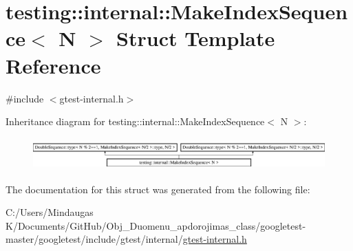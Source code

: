 \hypertarget{structtesting_1_1internal_1_1_make_index_sequence}{}\section{testing\+::internal\+::Make\+Index\+Sequence$<$ N $>$ Struct Template Reference}
\label{structtesting_1_1internal_1_1_make_index_sequence}


{\ttfamily \#include $<$gtest-\/internal.\+h$>$}

Inheritance diagram for testing\+::internal\+::Make\+Index\+Sequence$<$ N $>$\+:\begin{figure}[H]
\begin{center}
\leavevmode
\includegraphics[height=1.225383cm]{db/d4a/structtesting_1_1internal_1_1_make_index_sequence}
\end{center}
\end{figure}


The documentation for this struct was generated from the following file\+:\begin{DoxyCompactItemize}
\item 
C\+:/\+Users/\+Mindaugas K/\+Documents/\+Git\+Hub/\+Obj\+\_\+\+Duomenu\+\_\+apdorojimas\+\_\+class/googletest-\/master/googletest/include/gtest/internal/\mbox{\hyperlink{googletest-master_2googletest_2include_2gtest_2internal_2gtest-internal_8h}{gtest-\/internal.\+h}}\end{DoxyCompactItemize}

